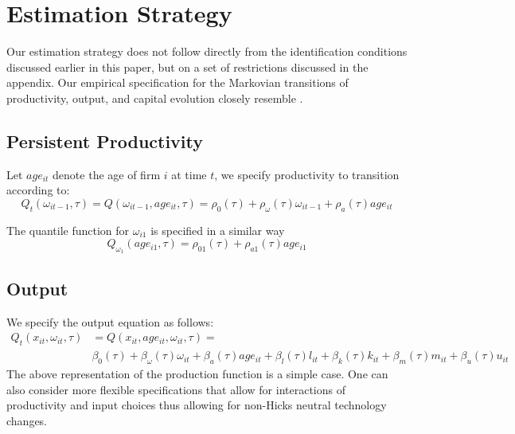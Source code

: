 \documentclass{article}
\begin{document}
\section{Estimation Strategy}
Our estimation strategy does not follow directly from the identification conditions discussed earlier in this paper, but on a set of restrictions discussed in the appendix. Our empirical specification for the Markovian transitions of productivity, output, and capital evolution closely resemble \cite{Arellano2017}. 
\subsection{Persistent Productivity}
Let $age_{it}$ denote the age of firm $i$ at time $t$, we specify productivity to transition according to:
\begin{equation}\label{omegamodel}
Q_{t}(\omega_{it-1}, \tau)=Q(\omega_{it-1}, age_{it}, \tau)=\rho_{0}(\tau)+\rho_{\omega}(\tau)\omega_{it-1}+\rho_{a}(\tau)age_{it}
\end{equation}

\noindent The quantile function for $\omega_{i1}$ is specified in a similar way
\begin{equation}
\label{omega1model}
Q_{\omega_{1}}(age_{i1}, \tau)=\rho_{01}(\tau)+\rho_{a1}(\tau)age_{i1}
\end{equation}

\subsection{Output}
We specify the output equation as follows:
\begin{equation}\label{ymodel}
\begin{split}
Q_{t}(x_{it}, \omega_{it}, \tau)&=Q(x_{it}, age_{it}, \omega_{it}, \tau)=\\
&\beta_{0}(\tau)+\beta_{\omega}(\tau)\omega_{it}+\beta_{a}(\tau)age_{it}+\beta_{l}(\tau)l_{it}+\beta_{k}(\tau)k_{it}+\beta_{m}(\tau)m_{it}+\beta_{u}(\tau)u_{it}
\end{split}
\end{equation}
The above representation of the production function is a simple case. One can also consider more flexible specifications that allow for interactions of productivity and input choices thus allowing for non-Hicks neutral technology changes.
\end{document}
